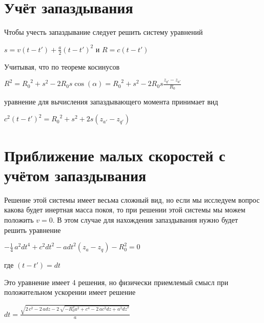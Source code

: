 \documentclass{article}
\begin{document}
\section{Учёт запаздывания}

Чтобы учесть запаздывание следует решить систему уравнений

$s=v\left( t-t' \right)+\frac{a}{2}{{\left( t-t' \right)}^{2}}$
и
$R=c\left( t-t' \right)$

Учитывая, что по теореме косинусов

${{R}^{2}}={{R}_{0}}^{2}+{{s}^{2}}-2{{R}_{0}}s\cos \left( \alpha  \right)={{R}_{0}}^{2}+{{s}^{2}}-2{{R}_{0}}s\frac{{{z}_{q'}}-{{z}_{a'}}}{{{R}_{0}}}$

уравнение для вычисления запаздывающего момента принимает вид

$c^{2}\left( t-t' \right)^{2}={{R}_{0}}^{2}+{{s}^{2}}+2s\left( {{z}_{a'}}-{{z}_{q'}} \right)$

\section{Приближение малых скоростей с учётом запаздывания}
Решение этой системы имеет весьма сложный вид, но если мы исследуем вопрос какова будет инертная масса покоя, то при решении этой системы мы можем положить $v = 0$. В этом случае для нахождения запаздывания нужно будет решить уравнение

$-\frac{1}{4} \, a^{2} \mathit{dt}^{4} + c^{2} \mathit{dt}^{2} - a \mathit{dt}^{2} {\left(z_{a} - z_{q}\right)} - R_{0}^{2} = 0$

где
$(t-t') = dt$

Это уравнение имеет 4 решения, но физически приемлемый смысл при положительном ускорении имеет решение




$\mathit{dt} = \frac{\sqrt{2 \, c^{2} - 2 \, a \mathit{dz} - 2 \, \sqrt{-R_{0}^{2} a^{2} + c^{4} - 2 \, a c^{2} \mathit{dz} + a^{2} \mathit{dz}^{2}}}}{a}$
\end{document}
